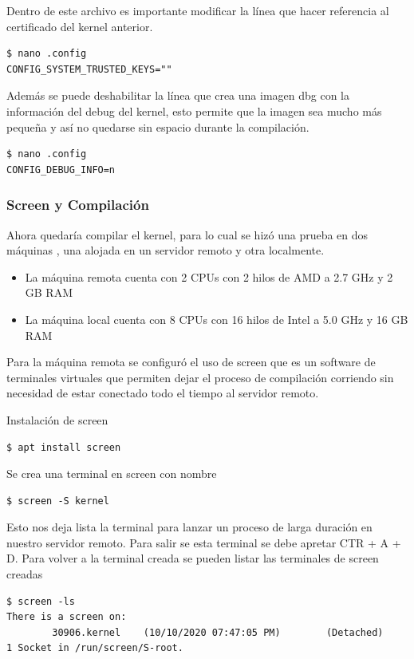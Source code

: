 \documentclass[12pt]{article}
\begin{document}
Dentro de este archivo es importante modificar la línea que hacer referencia al certificado del kernel anterior.
\begin{lstlisting}[frame=single]
$ nano .config
CONFIG_SYSTEM_TRUSTED_KEYS=""
\end{lstlisting}

Además se puede deshabilitar la línea que crea una imagen dbg con la información del debug del kernel, esto permite que la imagen sea mucho más pequeña y así no quedarse sin espacio durante la compilación.


\begin{lstlisting}[frame=single]
$ nano .config
CONFIG_DEBUG_INFO=n
\end{lstlisting}

\subsubsection{Screen y Compilación}
Ahora quedaría compilar el kernel, para lo cual se hizó una prueba en dos máquinas , una alojada en un servidor remoto y otra localmente. 

\begin{itemize}
\item La máquina remota cuenta con 2 CPUs con 2 hilos de AMD a 2.7 GHz y 2 GB RAM 
\item La máquina local cuenta con 8 CPUs  con 16 hilos de Intel a 5.0 GHz y 16 GB RAM
\end{itemize}

Para la máquina remota se configuró el uso de screen que es un software de terminales virtuales que permiten dejar el proceso de compilación corriendo sin necesidad de estar conectado todo el tiempo al servidor remoto.

Instalación de screen
\begin{lstlisting}[frame=single]
$ apt install screen
\end{lstlisting}

Se crea una terminal en screen con nombre
\begin{lstlisting}[frame=single]
$ screen -S kernel
\end{lstlisting}

Esto nos deja lista la terminal para lanzar un proceso de larga duración en nuestro servidor remoto. Para salir se esta terminal se debe apretar CTR + A + D. Para volver a la terminal creada se pueden listar las terminales de screen creadas
\begin{lstlisting}[frame=single]
$ screen -ls
There is a screen on:
        30906.kernel    (10/10/2020 07:47:05 PM)        (Detached)
1 Socket in /run/screen/S-root.
\end{lstlisting}
\end{document}
